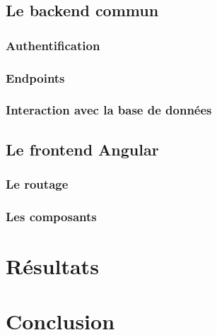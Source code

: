 \documentclass[11pt,a4paper]{report}
\begin{document}
\section{Le backend commun}
\subsection{Authentification}
\subsection{Endpoints}
\subsection{Interaction avec la base de données}
\section{Le frontend Angular}
\subsection{Le routage}
\subsection{Les composants}
\chapter{Résultats}
\chapter{Conclusion}


\end{document}
